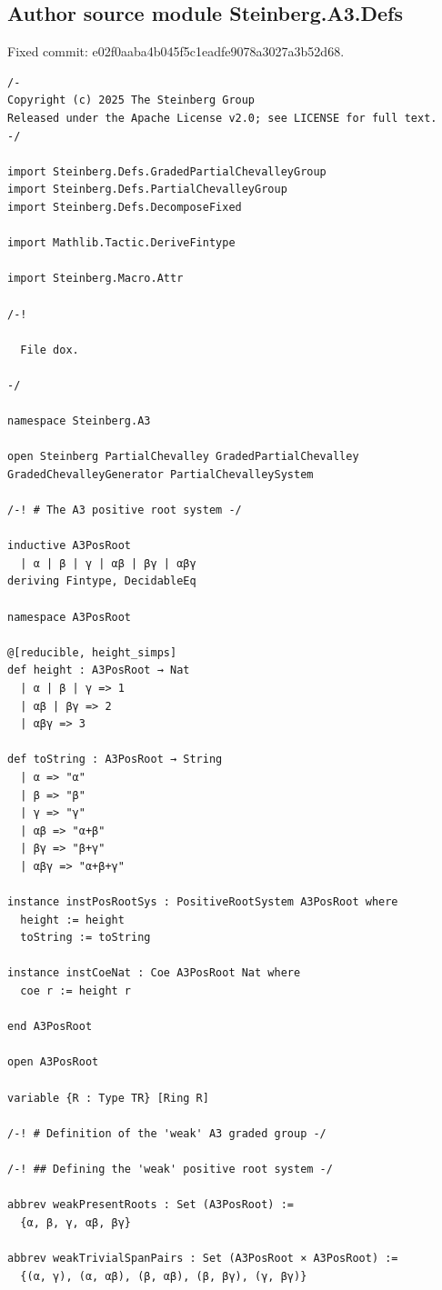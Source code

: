 \subsection*{Author source module Steinberg.A3.Defs}
\noindent Fixed commit: e02f0aaba4b045f5c1eadfe9078a3027a3b52d68.
\begin{Verbatim}
/-
Copyright (c) 2025 The Steinberg Group
Released under the Apache License v2.0; see LICENSE for full text.
-/

import Steinberg.Defs.GradedPartialChevalleyGroup
import Steinberg.Defs.PartialChevalleyGroup
import Steinberg.Defs.DecomposeFixed

import Mathlib.Tactic.DeriveFintype

import Steinberg.Macro.Attr

/-!

  File dox.

-/

namespace Steinberg.A3

open Steinberg PartialChevalley GradedPartialChevalley GradedChevalleyGenerator PartialChevalleySystem

/-! # The A3 positive root system -/

inductive A3PosRoot
  | α | β | γ | αβ | βγ | αβγ
deriving Fintype, DecidableEq

namespace A3PosRoot

@[reducible, height_simps]
def height : A3PosRoot → Nat
  | α | β | γ => 1
  | αβ | βγ => 2
  | αβγ => 3

def toString : A3PosRoot → String
  | α => "α"
  | β => "β"
  | γ => "γ"
  | αβ => "α+β"
  | βγ => "β+γ"
  | αβγ => "α+β+γ"

instance instPosRootSys : PositiveRootSystem A3PosRoot where
  height := height
  toString := toString

instance instCoeNat : Coe A3PosRoot Nat where
  coe r := height r

end A3PosRoot

open A3PosRoot

variable {R : Type TR} [Ring R]

/-! # Definition of the 'weak' A3 graded group -/

/-! ## Defining the 'weak' positive root system -/

abbrev weakPresentRoots : Set (A3PosRoot) :=
  {α, β, γ, αβ, βγ}

abbrev weakTrivialSpanPairs : Set (A3PosRoot × A3PosRoot) :=
  {(α, γ), (α, αβ), (β, αβ), (β, βγ), (γ, βγ)}


\end{Verbatim}
